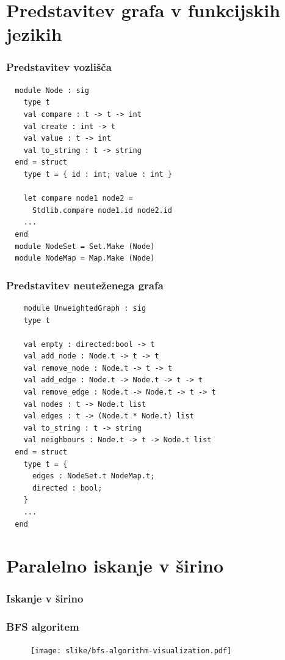 \documentclass{beamer}
\begin{document}
\section{Predstavitev grafa v funkcijskih jezikih}

\begin{frame}[fragile]
  \frametitle{Predstavitev vozlišča}
  \begin{verbatim}
  module Node : sig
    type t
    val compare : t -> t -> int
    val create : int -> t
    val value : t -> int
    val to_string : t -> string
  end = struct
    type t = { id : int; value : int }
  
    let compare node1 node2 = 
      Stdlib.compare node1.id node2.id
    ...
  end
  module NodeSet = Set.Make (Node)
  module NodeMap = Map.Make (Node)
  \end{verbatim}
\end{frame}

\begin{frame}[fragile]
  \frametitle{Predstavitev neuteženega grafa}
  \begin{verbatim}
    module UnweightedGraph : sig
    type t
  
    val empty : directed:bool -> t
    val add_node : Node.t -> t -> t
    val remove_node : Node.t -> t -> t
    val add_edge : Node.t -> Node.t -> t -> t
    val remove_edge : Node.t -> Node.t -> t -> t
    val nodes : t -> Node.t list
    val edges : t -> (Node.t * Node.t) list
    val to_string : t -> string
    val neighbours : Node.t -> t -> Node.t list
  end = struct
    type t = {
      edges : NodeSet.t NodeMap.t;
      directed : bool;
    }
    ...
  end  
  \end{verbatim}
\end{frame}

\section{Paralelno iskanje v širino}

  \frametitle{Iskanje v širino}
  \begin{frame}
    \frametitle{BFS algoritem}
    \begin{figure}[h!]
      \centering
      \texttt{[image: slike/bfs-algorithm-visualization.pdf]}
    \end{figure}
  \end{frame}
\end{document}

